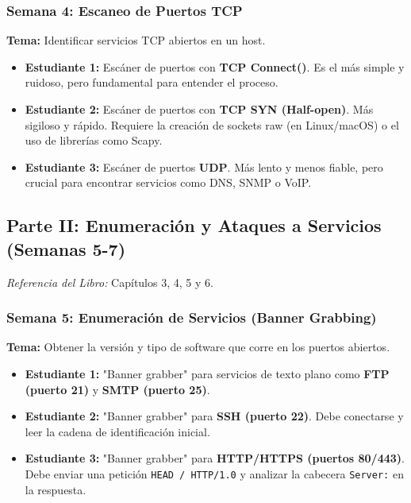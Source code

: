 \documentclass{article}
\begin{document}
\subsubsection*{Semana 4: Escaneo de Puertos TCP}
\textbf{Tema:} Identificar servicios TCP abiertos en un host.
\begin{itemize}
    \item \textbf{Estudiante 1:} Escáner de puertos con \textbf{TCP Connect()}. Es el más simple y ruidoso, pero fundamental para entender el proceso.
    \item \textbf{Estudiante 2:} Escáner de puertos con \textbf{TCP SYN (Half-open)}. Más sigiloso y rápido. Requiere la creación de sockets raw (en Linux/macOS) o el uso de librerías como Scapy.
    \item \textbf{Estudiante 3:} Escáner de puertos \textbf{UDP}. Más lento y menos fiable, pero crucial para encontrar servicios como DNS, SNMP o VoIP.
\end{itemize}

\subsection*{Parte II: Enumeración y Ataques a Servicios (Semanas 5-7)}
\textit{Referencia del Libro:} Capítulos 3, 4, 5 y 6.

\subsubsection*{Semana 5: Enumeración de Servicios (Banner Grabbing)}
\textbf{Tema:} Obtener la versión y tipo de software que corre en los puertos abiertos.
\begin{itemize}
    \item \textbf{Estudiante 1:} "Banner grabber" para servicios de texto plano como \textbf{FTP (puerto 21)} y \textbf{SMTP (puerto 25)}.
    \item \textbf{Estudiante 2:} "Banner grabber" para \textbf{SSH (puerto 22)}. Debe conectarse y leer la cadena de identificación inicial.
    \item \textbf{Estudiante 3:} "Banner grabber" para \textbf{HTTP/HTTPS (puertos 80/443)}. Debe enviar una petición \texttt{HEAD / HTTP/1.0} y analizar la cabecera \texttt{Server:} en la respuesta.
\end{itemize}
\end{document}
